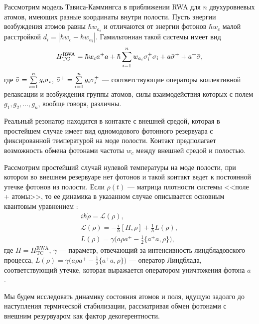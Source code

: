 Рассмотрим модель Тависа-Каммингса в приближении RWA \cite{ozhigov_qq,rwa_rabi_1,rwa_rabi_2} для $n$ двухуровневых атомов, имеющих разные координаты внутри полости. Пусть энергии возбуждения атомов равны $\hbar w_{a_{i}}$ и отличаются от энергии фотонов $\hbar w_{c}$ малой расстройкой $d_i=|\hbar w_{c}-\hbar w_{a_{i}}|$. Гамильтониан такой системы имеет вид
\begin{equation}
	\label{TC}
	H_{\text{TC}}^{\text{RWA}}=\hbar w_{c} a^+a+\hbar \sum\limits_{i=1}^{n}w_{a_{i}}\sigma^{+}_i\sigma_i+a\bar{\sigma}^{+}+a^{+}\bar{\sigma},
\end{equation}
где $\bar{\sigma}=\sum\limits_{i=1}^{n}g_{i}\sigma_{i}$, $\bar{\sigma}^{+}=\sum\limits_{i=1}^ng_{i}\sigma^{+}_{i}$ --- соответствующие операторы коллективной релаксации и возбуждения группы атомов, силы взаимодействия которых с полем $g_{1},g_{2},\dots,g_{n}$, вообще говоря, различны. 

Реальный резонатор находится в контакте с внешней средой, которая в простейшем случае имеет вид одномодового фотонного резервуара с фиксированной температурой на моде полости. Контакт предполагает возможность обмена фотонами частоты $w_{c}$ между внешней средой и полостью. 

Рассмотрим простейший случай нулевой температуры на моде полости, при котором во внешнем резервуаре нет фотонов и такой контакт ведет к постоянной утечке фотонов из полости. Если $\rho(t)$ --- матрица плотности системы <<поле + атомы>>, то ее динамика в указанном случае описывается основным квантовым уравнением \cite{breuer}:
\begin{equation}\label{lindblad}
	\begin{gathered}
		i\hbar\dot{\rho}={\mathcal{L}}(\rho),\\
		{\mathcal{L}}(\rho)=-\frac{i}{\hbar}[H,\rho]+\frac{1}{\hbar}L(\rho),\\
		L(\rho)=\gamma\biggl(a\rho a^+-\frac{1}{2}\{a^+a,\rho\}\biggr),
	\end{gathered}
\end{equation}
где  $H=H_{\text{TC}}^{\text{RWA}}$, $\gamma$ --- параметр, отвечающий за интенсивность линдбладовского процесса, $L(\rho)=\gamma\bigl(a\rho a^{+}-\frac{1}{2}\{a^{+}a,\rho\}\bigr)$ --- оператор Линдблада, соответствующий утечке, которая выражается оператором уничтожения фотона $a$ \cite{breuer,photon_emission}. 

Мы будем исследовать динамику состояния атомов и поля, идущую задолго до наступления термической стабилизации, рассматривая обмен фотонами с внешним резурвуаром как фактор декогерентности.

